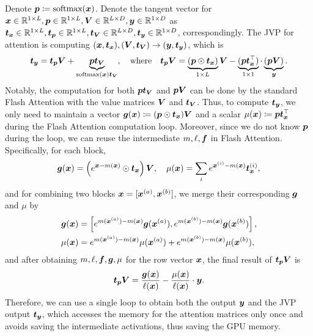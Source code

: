 Denote ${\bm{p}} \coloneqq \text{softmax}({\bm{x}})$. Denote the tangent vector for ${\bm{x}} \in \mathbb{R}^{1\times L},{\bm{p}}\in \mathbb{R}^{1\times L},{\bm{V}}\in\mathbb{R}^{L\times D},{\bm{y}}\in \mathbb{R}^{1\times D}$ as ${\bm{t}}_{{\bm{x}}}\in \mathbb{R}^{1\times L}, {\bm{t}}_{{\bm{p}}}\in \mathbb{R}^{1\times L}, {\bm{t}}_{{\bm{V}}}\in \mathbb{R}^{L\times D}, {\bm{t}}_{{\bm{y}}}\in \mathbb{R}^{1\times D}$, correspondingly. The JVP for attention is computing $({\bm{x}}, {\bm{t}}_{{\bm{x}}}), ({\bm{V}},{\bm{t}}_{{\bm{V}}})\rightarrow ({\bm{y}},{\bm{t}}_{{\bm{y}}})$, which is
\begin{equation*}
    {\bm{t}}_{{\bm{y}}} = {\bm{t}}_{{\bm{p}}} {\bm{V}} + \underbrace{{\bm{p}} {\bm{t}}_{{\bm{V}}}}_{\text{softmax}({\bm{x}}){\bm{t}}_{{\bm{V}}}},\quad \text{where}\quad 
    {\bm{t}}_{{\bm{p}}}{\bm{V}} = \underbrace{({\bm{p}} \odot {\bm{t}}_{{\bm{x}}})}_{1\times L}{\bm{V}} - \underbrace{({\bm{p}} {\bm{t}}^\top_{{\bm{x}}})}_{1\times 1}\cdot \underbrace{({\bm{p}} {\bm{V}})}_{{\bm{y}}}.
\end{equation*}
Notably, the computation for both ${\bm{p}} {\bm{t}}_{{\bm{V}}}$ and ${\bm{p}} {\bm{V}}$ can be done by the standard Flash Attention with the value matrices ${\bm{V}}$ and ${\bm{t}}_{{\bm{V}}}$. Thus, to compute ${\bm{t}}_{{\bm{y}}}$, we only need to maintain a vector ${\bm{g}}({\bm{x}})\coloneqq ({\bm{p}} \odot {\bm{t}}_{{\bm{x}}}){\bm{V}}$ and a scalar $\mu({\bm{x}})\coloneqq {\bm{p}} {\bm{t}}_{{\bm{x}}}^\top$ during the Flash Attention computation loop. Moreover, since we do not know ${\bm{p}}$ during the loop, we can reuse the intermediate $m,\ell, {\bm{f}}$ in Flash Attention. Specifically, for each block,
\begin{equation*}
    {\bm{g}}({\bm{x}}) = \left(
        e^{{\bm{x}} - m({\bm{x}})} \odot {\bm{t}}_{{\bm{x}}}
    \right){\bm{V}}, \quad
    \mu({\bm{x}}) = \sum_{i} e^{{\bm{x}}^{(i)} - m({\bm{x}})} {\bm{t}}_{{\bm{x}}}^{(i)},
\end{equation*}
and for combining two blocks ${\bm{x}} = [{\bm{x}}^{(a)}, {\bm{x}}^{(b)}]$, we merge their corresponding ${\bm{g}}$ and $\mu$ by
\begin{equation*}
\begin{aligned}
    {\bm{g}}({\bm{x}}) &= \left[
        e^{m({\bm{x}}^{(a)}) - m({\bm{x}})}{\bm{g}}({\bm{x}}^{(a)}), e^{m({\bm{x}}^{(b)}) - m({\bm{x}})}{\bm{g}}({\bm{x}}^{(b)})
    \right], \\
    \mu({\bm{x}}) &= e^{m({\bm{x}}^{(a)}) - m({\bm{x}})}\mu({\bm{x}}^{(a)}) + e^{m({\bm{x}}^{(b)}) - m({\bm{x}})}\mu({\bm{x}}^{(b)}),
\end{aligned}
\end{equation*}
and after obtaining $m,\ell,{\bm{f}},{\bm{g}},\mu$ for the row vector ${\bm{x}}$, the final result of ${\bm{t}}_{{\bm{p}}}{\bm{V}}$ is
\begin{equation*}
    {\bm{t}}_{{\bm{p}}}{\bm{V}} = \frac{{\bm{g}}({\bm{x}})}{\ell({\bm{x}})}  - \frac{\mu({\bm{x}})}{\ell({\bm{x}})} \cdot {\bm{y}}.
\end{equation*}
Therefore, we can use a single loop to obtain both the output ${\bm{y}}$ and the JVP output ${\bm{t}}_{{\bm{y}}}$, which accesses the memory for the attention matrices only once and avoids saving the intermediate activations, thus saving the GPU memory. 


